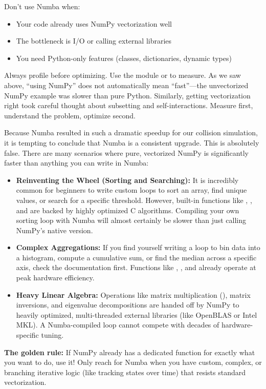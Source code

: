 Don't use Numba when:
\begin{itemize}
    \item Your code already uses NumPy vectorization well
    \item The bottleneck is I/O or calling external libraries
    \item You need Python-only features (classes, dictionaries, dynamic types)
\end{itemize}

\begin{tip}
Always profile before optimizing. Use the  module or  to measure. As we saw above, ``using NumPy'' does not automatically mean ``fast''---the unvectorized NumPy example was slower than pure Python. Similarly, getting vectorization right took careful thought about subsetting and self-interactions. Measure first, understand the problem, optimize second.
\end{tip}

\begin{warning}
Because Numba resulted in such a dramatic speedup for our collision simulation, it is tempting to conclude that Numba is a consistent upgrade. This is absolutely false. There are many scenarios where pure, vectorized NumPy is significantly faster than anything you can write in Numba:

\begin{itemize}
    \item \textbf{Reinventing the Wheel (Sorting and Searching):} It is incredibly common for beginners to write custom loops to sort an array, find unique values, or search for a specific threshold. However, built-in functions like , , and  are backed by highly optimized C algorithms. Compiling your own sorting loop with Numba will almost certainly be slower than just calling NumPy's native version.
    \item \textbf{Complex Aggregations:} If you find yourself writing a loop to bin data into a histogram, compute a cumulative sum, or find the median across a specific axis, check the documentation first. Functions like , , and  already operate at peak hardware efficiency.
    \item \textbf{Heavy Linear Algebra:} Operations like matrix multiplication (), matrix inversions, and eigenvalue decompositions are handed off by NumPy to heavily optimized, multi-threaded external libraries (like OpenBLAS or Intel MKL). A Numba-compiled  loop cannot compete with decades of hardware-specific tuning.
\end{itemize}

\textbf{The golden rule:} If NumPy already has a dedicated function for exactly what you want to do, use it! Only reach for Numba when you have custom, complex, or branching iterative logic (like tracking states over time) that resists standard vectorization.
\end{warning}

